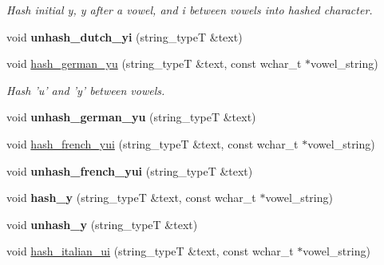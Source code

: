 \begin{DoxyCompactItemize}
\begin{DoxyCompactList}\small\item\em Hash initial y, y after a vowel, and i between vowels into hashed character. \end{DoxyCompactList}\item 
\hypertarget{classstemming_1_1stem_a00a03f9e29573b89ff269e3832aa019b}{void {\bfseries unhash\+\_\+dutch\+\_\+yi} (string\+\_\+type\+T \&text)}\label{classstemming_1_1stem_a00a03f9e29573b89ff269e3832aa019b}

\item 
\hypertarget{classstemming_1_1stem_a2ab335f89cb2e65564a7985156d6ce19}{void \hyperlink{classstemming_1_1stem_a2ab335f89cb2e65564a7985156d6ce19}{hash\+\_\+german\+\_\+yu} (string\+\_\+type\+T \&text, const wchar\+\_\+t $\ast$vowel\+\_\+string)}\label{classstemming_1_1stem_a2ab335f89cb2e65564a7985156d6ce19}

\begin{DoxyCompactList}\small\item\em Hash 'u' and 'y' between vowels. \end{DoxyCompactList}\item 
\hypertarget{classstemming_1_1stem_a70ee7015775ebb7d8b98a1724f94448e}{void {\bfseries unhash\+\_\+german\+\_\+yu} (string\+\_\+type\+T \&text)}\label{classstemming_1_1stem_a70ee7015775ebb7d8b98a1724f94448e}

\item 
void \hyperlink{classstemming_1_1stem_a0fa77155cef02f4efa2a537450ef4004}{hash\+\_\+french\+\_\+yui} (string\+\_\+type\+T \&text, const wchar\+\_\+t $\ast$vowel\+\_\+string)
\item 
\hypertarget{classstemming_1_1stem_a11e5585424ce623ee7842a039bdfb7cb}{void {\bfseries unhash\+\_\+french\+\_\+yui} (string\+\_\+type\+T \&text)}\label{classstemming_1_1stem_a11e5585424ce623ee7842a039bdfb7cb}

\item 
\hypertarget{classstemming_1_1stem_ab7cc895f7a16b9bec4a4c4614111ecb3}{void {\bfseries hash\+\_\+y} (string\+\_\+type\+T \&text, const wchar\+\_\+t $\ast$vowel\+\_\+string)}\label{classstemming_1_1stem_ab7cc895f7a16b9bec4a4c4614111ecb3}

\item 
\hypertarget{classstemming_1_1stem_acc93df08d3d68d2468aa3e7cf23c7089}{void {\bfseries unhash\+\_\+y} (string\+\_\+type\+T \&text)}\label{classstemming_1_1stem_acc93df08d3d68d2468aa3e7cf23c7089}

\item 
\hypertarget{classstemming_1_1stem_a11d05105fc3e03bd5f2ff581bc4eb6fe}{void \hyperlink{classstemming_1_1stem_a11d05105fc3e03bd5f2ff581bc4eb6fe}{hash\+\_\+italian\+\_\+ui} (string\+\_\+type\+T \&text, const wchar\+\_\+t $\ast$vowel\+\_\+string)}\label{classstemming_1_1stem_a11d05105fc3e03bd5f2ff581bc4eb6fe}


\end{DoxyCompactItemize}
